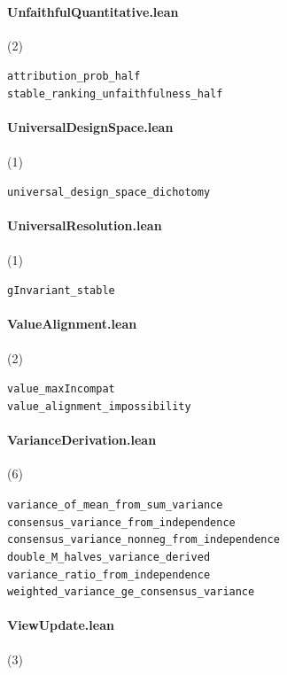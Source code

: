 \paragraph{UnfaithfulQuantitative.lean} (2)

{\footnotesize
\texttt{attribution\_prob\_half}\\
\texttt{stable\_ranking\_unfaithfulness\_half}\\
}

\paragraph{UniversalDesignSpace.lean} (1)

{\footnotesize
\texttt{universal\_design\_space\_dichotomy}\\
}

\paragraph{UniversalResolution.lean} (1)

{\footnotesize
\texttt{gInvariant\_stable}\\
}

\paragraph{ValueAlignment.lean} (2)

{\footnotesize
\texttt{value\_maxIncompat}\\
\texttt{value\_alignment\_impossibility}\\
}

\paragraph{VarianceDerivation.lean} (6)

{\footnotesize
\texttt{variance\_of\_mean\_from\_sum\_variance}\\
\texttt{consensus\_variance\_from\_independence}\\
\texttt{consensus\_variance\_nonneg\_from\_independence}\\
\texttt{double\_M\_halves\_variance\_derived}\\
\texttt{variance\_ratio\_from\_independence}\\
\texttt{weighted\_variance\_ge\_consensus\_variance}\\
}

\paragraph{ViewUpdate.lean} (3)

